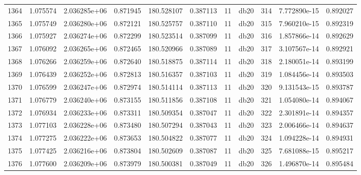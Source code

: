 \begin{tabular}{lrrrrrrlrrr}
1364 &    1.075574 &        2.036285e+06 &  0.871945 &              180.528107 &    0.387113 &      11 &         db20 &    314 &   7.772890e-15 &      0.892027 \\
1365 &    1.075749 &        2.036280e+06 &  0.872121 &              180.525757 &    0.387110 &      11 &         db20 &    315 &   7.960210e-15 &      0.892319 \\
1366 &    1.075927 &        2.036274e+06 &  0.872299 &              180.523514 &    0.387099 &      11 &         db20 &    316 &   1.857866e-14 &      0.892629 \\
1367 &    1.076092 &        2.036265e+06 &  0.872465 &              180.520966 &    0.387089 &      11 &         db20 &    317 &   3.107567e-14 &      0.892921 \\
1368 &    1.076266 &        2.036259e+06 &  0.872640 &              180.518875 &    0.387114 &      11 &         db20 &    318 &   2.180051e-14 &      0.893199 \\
1369 &    1.076439 &        2.036252e+06 &  0.872813 &              180.516357 &    0.387103 &      11 &         db20 &    319 &   1.084456e-14 &      0.893503 \\
1370 &    1.076599 &        2.036247e+06 &  0.872974 &              180.514114 &    0.387113 &      11 &         db20 &    320 &   9.131543e-15 &      0.893787 \\
1371 &    1.076779 &        2.036240e+06 &  0.873155 &              180.511856 &    0.387108 &      11 &         db20 &    321 &   1.054080e-14 &      0.894067 \\
1372 &    1.076934 &        2.036233e+06 &  0.873311 &              180.509354 &    0.387047 &      11 &         db20 &    322 &   2.301891e-14 &      0.894357 \\
1373 &    1.077103 &        2.036228e+06 &  0.873480 &              180.507294 &    0.387043 &      11 &         db20 &    323 &   2.006466e-14 &      0.894637 \\
1374 &    1.077275 &        2.036222e+06 &  0.873653 &              180.504822 &    0.387077 &      11 &         db20 &    324 &   1.094228e-14 &      0.894931 \\
1375 &    1.077425 &        2.036216e+06 &  0.873804 &              180.502609 &    0.387087 &      11 &         db20 &    325 &   7.681088e-15 &      0.895217 \\
1376 &    1.077600 &        2.036209e+06 &  0.873979 &              180.500381 &    0.387049 &      11 &         db20 &    326 &   1.496870e-14 &      0.895484 \\

\end{tabular}
